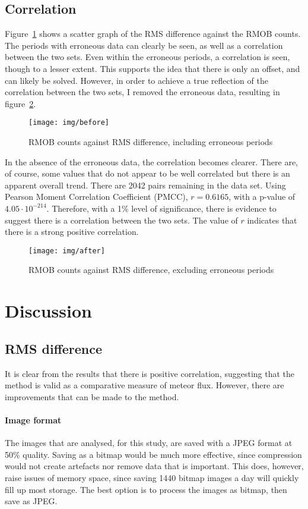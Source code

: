 \subsection{Correlation}
Figure~\ref{fig:img:before} shows a scatter graph of the RMS difference against the RMOB counts. The periods with erroneous data can clearly be seen, as well as a correlation between the two sets. Even within the erroneous periods, a correlation is seen, though to a lesser extent. This supports the idea that there is only an offset, and can likely be solved. However, in order to achieve a true reflection of the correlation between the two sets, I removed the erroneous data, resulting in figure~\ref{fig:img:after}.
\begin{figure}[h!]
	\centering
	\texttt{[image: img/before]}
	\caption{RMOB counts against RMS difference, including erroneous periods
		\label{fig:img:before}}
\end{figure}
In the absence of the erroneous data, the correlation becomes clearer. There are, of course, some values that do not appear to be well correlated but there is an apparent overall trend. There are 2042 pairs remaining in the data set. Using Pearson Moment Correlation Coefficient (PMCC), $r = 0.6165$, with a p-value of $4.05 \cdot 10^{-214}$. Therefore, with a 1\% level of significance, there is evidence to suggest there is a correlation between the two sets. The value of $r$ indicates that there is a strong positive correlation.
\begin{figure}[h!]
	\centering
	\texttt{[image: img/after]}
	\caption{RMOB counts against RMS difference, excluding erroneous periods
		\label{fig:img:after}}
\end{figure}

\section{Discussion}
\subsection{RMS difference}
It is clear from the results that there is positive correlation, suggesting that the method is valid as a comparative measure of meteor flux. However, there are improvements that can be made to the method.
\paragraph{Image format\\}
The images that are analysed, for this study, are saved with a JPEG format at 50\% quality. Saving as a bitmap would be much more effective, since compression would not create artefacts nor remove data that is important. This does, however, raise issues of memory space, since saving 1440 bitmap images a day will quickly fill up most storage. The best option is to process the images as bitmap, then save as JPEG.
